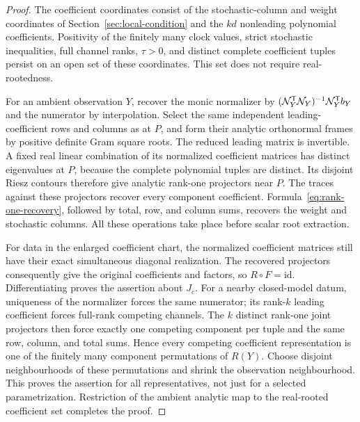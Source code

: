 \begin{proof}
The coefficient coordinates consist of the stochastic-column and
weight coordinates of Section~\ref{sec:local-condition} and the $kd$
nonleading polynomial coefficients. Positivity of the finitely many
clock values, strict stochastic inequalities, full channel ranks,
$\tau>0$, and distinct complete coefficient tuples persist on an open
set of these coordinates. This set does not require real-rootedness.

For an ambient observation $Y$, recover the monic normalizer by
$(\mathcal N_Y^{\mathsf T}\mathcal N_Y)^{-1}\mathcal N_Y^{\mathsf T}b_Y$ and the numerator
by interpolation. Select the same independent leading-coefficient
rows and columns as at $P$, and form their analytic orthonormal frames
by positive definite Gram square roots. The reduced leading matrix is
invertible. A fixed real linear combination of its normalized
coefficient matrices has distinct eigenvalues at $P$, because the
complete polynomial tuples are distinct. Its disjoint Riesz contours
therefore give analytic rank-one projectors near $P$.
The traces against these projectors recover every component
coefficient. Formula~\eqref{eq:rank-one-recovery}, followed by total,
row, and column sums, recovers the weight and stochastic columns.
All these operations take place before scalar root extraction.

For data in the enlarged coefficient chart, the normalized
coefficient matrices still have their exact simultaneous diagonal
realization. The recovered projectors consequently give the original
coefficients and factors, so $R\circ F=\mathrm{id}$. Differentiating
proves the assertion about $J_c$. For a nearby closed-model datum,
uniqueness of the normalizer forces the same numerator; its rank-$k$
leading coefficient forces full-rank competing channels. The $k$
distinct rank-one joint projectors then force exactly one competing
component per tuple and the same row, column, and total sums. Hence
every competing coefficient representation is one of the finitely
many component permutations of $R(Y)$. Choose disjoint neighbourhoods
of these permutations and shrink the observation neighbourhood.
This proves the assertion for all representatives, not just for a
selected parametrization. Restriction of the ambient analytic map to
the real-rooted coefficient set completes the proof.
\end{proof}
